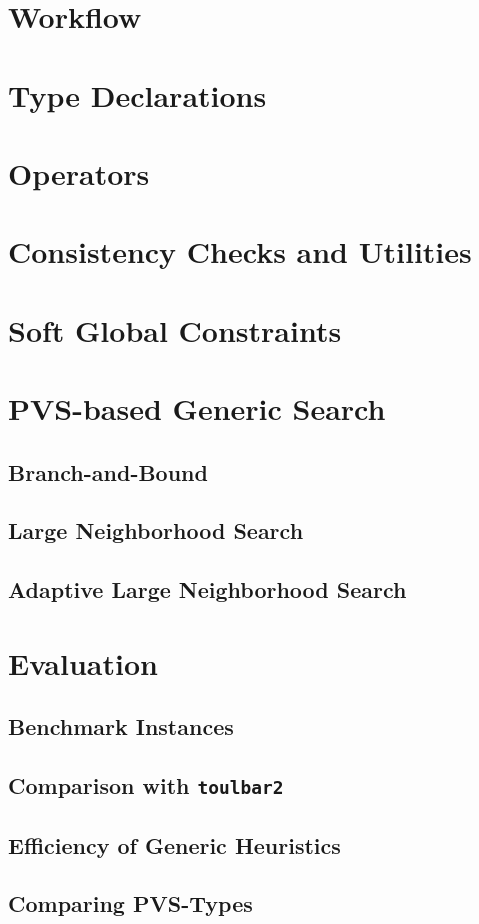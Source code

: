 \documentclass[10pt,a4paper]{book}
\begin{document}
\section{Workflow}
\section{Type Declarations}
\section{Operators}
\section{Consistency Checks and Utilities}
\section{Soft Global Constraints}
\section{PVS-based Generic Search}
\subsection{Branch-and-Bound}
\subsection{Large Neighborhood Search}
\subsection{Adaptive Large Neighborhood Search}
\section{Evaluation}
\subsection{Benchmark Instances}
\subsection{Comparison with \texttt{toulbar2}}
\subsection{Efficiency of Generic Heuristics}
\subsection{Comparing PVS-Types}
\end{document}
